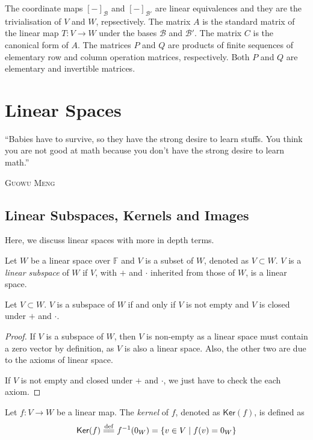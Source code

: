 \documentclass[
	11pt, %
	fleqn, %
	a4paper, %
]{LegrandOrangeBook}
\renewcommand{\ker}[1]{\mathsf{Ker}(#1)} %
\newcommand{\F}{\mathbb{F}} %
\newcommand{\B}{\mathcal{B}} %
\let\originalepigraph\epigraph
\renewcommand\epigraph[2]{\originalepigraph{#1}{\textsc{#2}}}
\begin{document}
The coordinate maps $[-]_{\B}$ and $[-]_{\B'}$ are linear equivalences and they are the trivialisation of $V$ and $W$, repsectively. The matrix $A$ is the standard matrix of the linear map $T: V \to W$ under the bases $\B$ and $\B'$. The matrix $C$ is the canonical form of $A$. The matrices $P$ and $Q$ are products of finite sequences of elementary row and column operation matrices, respectively. Both $P$ and $Q$ are elementary and invertible matrices.

\chapter{Linear Spaces}

\epigraph{``Babies have to survive, so they have the strong desire to learn stuffs. You think you are not good at math because you don't have the strong desire to learn math.''}{Guowu Meng}

\section{Linear Subspaces, Kernels and Images}

Here, we discuss linear spaces with more in depth terms.

\begin{definition}
    Let $W$ be a linear space over $\F$ and $V$ is a subset of $W$, denoted as $V \subset W$. $V$ is a \emph{linear subspace} of $W$ if $V$, with $+$ and $\cdot$ inherited from those of $W$, is a linear space.
\end{definition}

\begin{proposition}
    Let $V \subset W$. $V$ is a subspace of $W$ if and only if $V$ is not empty and $V$ is closed under $+$ and $\cdot$.
\end{proposition}

\begin{proof}
    If $V$ is a subspace of $W$, then $V$ is non-empty as a linear space must contain a zero vector by definition, as $V$ is also a linear space. Also, the other two are due to the axioms of linear space.

    If $V$ is not empty and closed under $+$ and $\cdot$, we just have to check the each axiom.
\end{proof}

\begin{definition}[Kernels]
    Let $f : V \to W$ be a linear map. The \emph{kernel} of $f$, denoted as $\ker f$, is defined as 
    \[
        \ker f \overset{\text{def}}{=\joinrel=} f^{-1}(0_W) = \{ v \in V \mid f(v) = 0_W \}
    \]
\end{definition}
\end{document}
